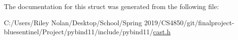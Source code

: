 The documentation for this struct was generated from the following file\+:\begin{DoxyCompactItemize}
\item 
C\+:/\+Users/\+Riley Nolan/\+Desktop/\+School/\+Spring 2019/\+C\+S4850/git/finalproject-\/bluesentinel/\+Project/pybind11/include/pybind11/\mbox{\hyperlink{cast_8h}{cast.\+h}}\end{DoxyCompactItemize}
